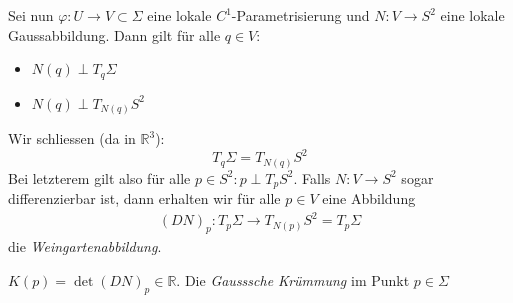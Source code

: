 \documentclass[../main.tex]{subfiles}
\begin{document}
Sei nun $\varphi : U \to V \subset \Sigma$ eine lokale $C^{1}$-Parametrisierung und $N:V \to S^{2}$ eine lokale Gaussabbildung. Dann gilt für alle $q \in V$:


\begin{itemize}
    \item $N(q) \perp T_{q}\Sigma$
    \item $N(q) \perp T_{N(q)}S^{2}$
\end{itemize}
Wir schliessen (da in $\mathbb{R}^3$): $$T_{q}\Sigma = T_{N(q)}S^{2}$$
Bei letzterem gilt also für alle $ p \in S^{2}: p\perp T_{p}S^2$.
Falls $N:V \to S^{2}$ sogar differenzierbar ist, dann erhalten wir für alle $ p \in V$ eine Abbildung
\begin{align*}
    (DN)_{p}: T_{p}\Sigma \to T_{N(p)}S^{2} = T_{p}\Sigma    
\end{align*}
die \emph{Weingartenabbildung}.

\begin{definition}$K(p) = \det{(DN)_{p}}\in \mathbb{R}$. Die \emph{Gausssche Krümmung} im Punkt $p \in \Sigma$
\end{definition}
\end{document}
